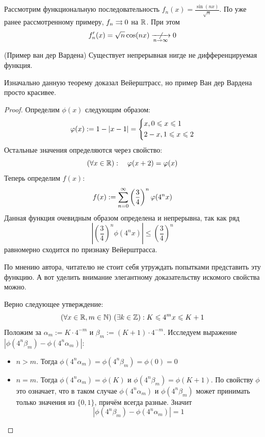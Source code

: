 \begin{example}
	Рассмотрим функциональную последовательность $f_n(x) = \frac{\sin (nx)}{\sqrt{n}}$. По уже ранее рассмотренному примеру, $f_n \rightrightarrows 0$ на $\mathbb{R}$. При этом
	\[
		f'_n(x) = \sqrt{n} \cos (nx) \centernot{\xrightarrow[n \to \infty]{}} 0
	\]
\end{example}

\begin{theorem} (Пример ван дер Вардена)
	Существует непрерывная нигде не дифференцируемая функция.
\end{theorem}

\begin{note}
	Изначально данную теорему доказал Вейерштрасс, но пример Ван дер Вардена просто красивее.
\end{note}

\begin{proof}
	Определим $\phi(x)$ следующим образом:
	\[
		\varphi(x) := 1 - |x - 1| = \left\{\begin{aligned}
			&{x, 0 \leqslant x \leqslant 1}
			\\
			&{2 - x, 1 \leqslant x \leqslant 2}
		\end{aligned}\right.
	\]
	Остальные значения определяются через свойство:
	\[
		(\forall x \in \mathbb{R}) :\quad \varphi(x + 2) = \varphi(x)
	\]
	Теперь определим $f(x)$:
	\[
		f(x) := \sum_{n = 0}^\infty \left(\frac{3}{4}\right)^n \varphi(4^n x)
	\]
	Данная функция очевидным образом определена и непрерывна, так как ряд
	\[
		\left|\left(\frac{3}{4}\right)^n \phi(4^n x)\right| \le \left(\frac{3}{4}\right)^n
	\]
	равномерно сходится по признаку Вейерштрасса.
	
	По мнению автора, читателю не стоит себя утруждать попытками представить эту функцию. А вот уделить внимание элегантному доказательству искомого  свойства можно.
	
	Верно следующее утверждение:
	\[
		(\forall x \in \mathbb{R}, m \in \mathbb{N})\ (\exists k \in \mathbb{Z}) : K \leqslant 4^m x \leqslant K + 1
	\]
	Положим за $\alpha_m := K \cdot 4^{-m}$ и $\beta_m := (K + 1) \cdot 4^{-m}$. Исследуем выражение $|\phi(4^n\beta_m) - \phi(4^n\alpha_m)|$:
	\begin{itemize}
		\item $n > m$. Тогда $\phi(4^n \alpha_m) = \phi(4^n \beta_m) = \phi(0) = 0$
		
		\item $n = m$. Тогда $\phi(4^n \alpha_m) = \phi(K)$ и $\phi(4^n \beta_m) = \phi(K + 1)$. По свойству $\phi$ это означает, что в таком случае $\phi(4^n \alpha_m)$ и $\phi(4^n \beta_m)$ может принимать только значения из $\{0, 1\}$, причём всегда разные. Значит
		\[
			|\phi(4^n \beta_m) - \phi(4^n \alpha_m)| = 1
		\]
		

\end{itemize}
\end{proof}
